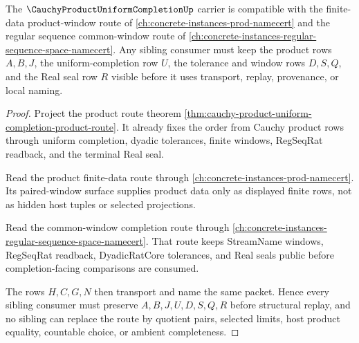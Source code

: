 \begin{theorem}
\label{thm:cauchy-product-uniform-completion-sibling-compatibility}
The $\CauchyProductUniformCompletionUp$ carrier is compatible with the finite-data product-window route of \autoref{ch:concrete-instances-prod-namecert} and the regular sequence common-window route of \autoref{ch:concrete-instances-regular-sequence-space-namecert}. Any sibling consumer must keep the product rows $A,B,J$, the uniform-completion row $U$, the tolerance and window rows $D,S,Q$, and the Real seal row $R$ visible before it uses transport, replay, provenance, or local naming.
\end{theorem}
\begin{proof}
Project the product route theorem \autoref{thm:cauchy-product-uniform-completion-product-route}. It already fixes the order from Cauchy product rows through uniform completion, dyadic tolerances, finite windows, RegSeqRat readback, and the terminal Real seal.

Read the product finite-data route through \autoref{ch:concrete-instances-prod-namecert}. Its paired-window surface supplies product data only as displayed finite rows, not as hidden host tuples or selected projections.

Read the common-window completion route through \autoref{ch:concrete-instances-regular-sequence-space-namecert}. That route keeps StreamName windows, RegSeqRat readback, DyadicRatCore tolerances, and Real seals public before completion-facing comparisons are consumed.

The rows $H,C,G,N$ then transport and name the same packet. Hence every sibling consumer must preserve $A,B,J,U,D,S,Q,R$ before structural replay, and no sibling can replace the route by quotient pairs, selected limits, host product equality, countable choice, or ambient completeness.
\end{proof}



